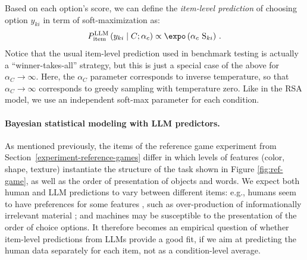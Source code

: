 \documentclass[fleqn]{article}
\begin{document}
Based on each option's score, we can define the \emph{item-level prediction} of choosing option $y_{ki}$ in term of soft-maximization as:
%
\begin{align*}
P_{\text{item}}^{\text{LLM}}\left ( y_{ki} \mid C; \alpha_{c} \right ) \propto \expo \left (\alpha_{c} \ \text{S}_{ki} \right)\,.
\end{align*}
%
Notice that the usual item-level prediction used in benchmark testing is actually a ``winner-takes-all'' strategy, but this is just a special case of the above for $\alpha_{C} \rightarrow \infty$.
Here, the $\alpha_{C}$ parameter corresponds to inverse temperature, so that $\alpha_{C} \rightarrow \infty$ corresponds to greedy sampling with temperature zero.
Like in the RSA model, we use an independent soft-max parameter for each condition.

\paragraph{Bayesian statistical modeling with LLM predictors.}
As mentioned previously, the items of the reference game experiment from Section~\ref{experiment-reference-games} differ in which levels of features (color, shape, texture) instantiate the structure of the task shown in Figure \ref{fig:ref-game}, as well as the order of presentation of objects and words.
We expect both human and LLM predictions to vary between different items: e.g., humans seem to have preferences for some features \citep[e.g.,][]{QingFranke2013:Variations-on-a}, such as over-production of informationally irrelevant material \citep[e.g.,][]{DaviesKatsos2010:Over-informativ,Rubio-Fernandez2019:Overinformative,DegenHawkins2020:When-redundancy}; and machines may be susceptible to the presentation of the order of choice options. 
It therefore becomes an empirical question of whether item-level predictions from LLMs provide a good fit, if we aim at predicting the human data separately for each item, not as a condition-level average.
\end{document}
